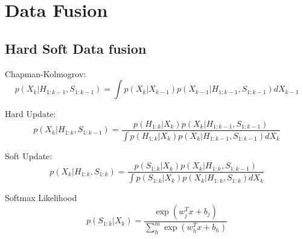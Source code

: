 \chapter{Data Fusion} \label{Chapter: Derivations}

\section{Hard Soft Data fusion}

\newcommand{\CP}[2]{\ensuremath{p(#1|#2)}} %

\newcommand{\tstamp}{\ensuremath{k}}
\newcommand{\state}{\ensuremath{X}}
\newcommand{\statei}{\ensuremath{x}}
\newcommand{\stateTime}{\ensuremath{\state_{\tstamp}}}
\newcommand{\stateTimePri}{\ensuremath{\state_{\tstamp-1}}}

\newcommand{\hard}{\ensuremath{H}}
\newcommand{\hardTime}{\ensuremath{\hard_\tstamp}}
\newcommand{\hardRange}[2]{\ensuremath{\hard_{#1:#2}}}
\newcommand{\hardUpToPri}{\ensuremath{\hardRange{1}{\tstamp-1}}}
\newcommand{\hardUpToTime}{\ensuremath{\hardRange{1}{\tstamp}}}

\newcommand{\soft}{\ensuremath{S}}
\newcommand{\softTime}{\ensuremath{\soft_\tstamp}}
\newcommand{\softRange}[2]{\ensuremath{\soft_{#1:#2}}}
\newcommand{\softUpToPri}{\ensuremath{\softRange{1}{\tstamp-1}}}
\newcommand{\softUpToTime}{\ensuremath{\softRange{1}{\tstamp}}}

\newcommand{\smWeight}{\ensuremath{w}}
\newcommand{\smCat}{\ensuremath{j}}
\newcommand{\smBias}{\ensuremath{b}}
\newcommand{\smNumCat}{\ensuremath{m}}

Chapman-Kolmogrov:
\begin{equation}
\CP{\stateTime}{\hardUpToPri,\softUpToPri}= \int \CP{\stateTime}{\stateTimePri}\CP{\stateTimePri}{\hardUpToPri,\softUpToPri} d\stateTimePri
\end{equation}

Hard Update:
\begin{equation}
\CP{\stateTime}{\hardUpToTime,\softUpToPri}=\frac{\CP{\hardUpToTime}{\stateTime}\CP{\stateTime}{\hardUpToPri,\softUpToPri}}{\int \CP{\hardUpToTime}{\stateTime}\CP{\stateTime}{\hardUpToPri,\softUpToPri}d\stateTime}
\end{equation}

Soft Update:
\begin{equation}
\CP{\stateTime}{\hardUpToTime,\softUpToTime}= \frac{\CP{\softUpToTime}{\stateTime}\CP{\stateTime}{\hardUpToTime, \softUpToPri}}{\int \CP{\softUpToTime}{\stateTime}\CP{\stateTime}{\hardUpToTime,\softUpToTime}d\stateTime}
\end{equation}

Softmax Likelihood
\begin{equation}
\CP{\softUpToTime}{\stateTime}=\frac{\exp(\smWeight_\smCat^T \statei +\smBias_\smCat)}{\sum^\smNumCat_h\exp(\smWeight_h^T\statei +\smBias_h)}
\end{equation}

